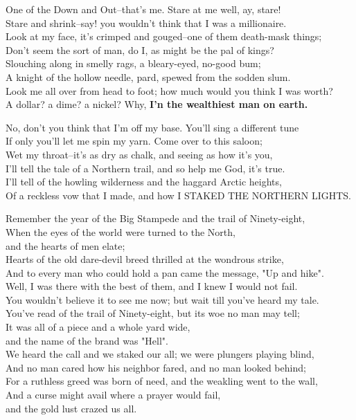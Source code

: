 
\begin{poemblock}
One of the Down and Out--that's me.  Stare at me well, ay, stare!\\
Stare and shrink--say! you wouldn't think that I was a millionaire.\\
Look at my face, it's crimped and gouged--one of them death-mask things;\\
Don't seem the sort of man, do I, as might be the pal of kings?\\
Slouching along in smelly rags, a bleary-eyed, no-good bum;\\
A knight of the hollow needle, pard, spewed from the sodden slum.\\
Look me all over from head to foot; how much would you think I was worth?\\
A dollar? a dime? a nickel?  Why, \textbf{I'n the wealthiest man on earth.}

No, don't you think that I'm off my base.  You'll sing a different tune\\
If only you'll let me spin my yarn.  Come over to this saloon;\\
Wet my throat--it's as dry as chalk, and seeing as how it's you,\\
I'll tell the tale of a Northern trail, and so help me God, it's true.\\
I'll tell of the howling wilderness and the haggard Arctic heights,\\
Of a reckless vow that I made, and how I STAKED THE NORTHERN LIGHTS.

Remember the year of the Big Stampede and the trail of Ninety-eight,\\
When the eyes of the world were turned to the North,\\
\idt and the hearts of men elate;\\
Hearts of the old dare-devil breed thrilled at the wondrous strike,\\
And to every man who could hold a pan came the message, "Up and hike".\\
Well, I was there with the best of them, and I knew I would not fail.\\
You wouldn't believe it to see me now; but wait till you've heard my tale.\\

You've read of the trail of Ninety-eight, but its woe no man may tell;\\
It was all of a piece and a whole yard wide,\\
\idt and the name of the brand was "Hell".\\
We heard the call and we staked our all; we were plungers playing blind,\\
And no man cared how his neighbor fared, and no man looked behind;\\
For a ruthless greed was born of need, and the weakling went to the wall,\\
And a curse might avail where a prayer would fail,\\
\idt and the gold lust crazed us all.


\end{poemblock}
